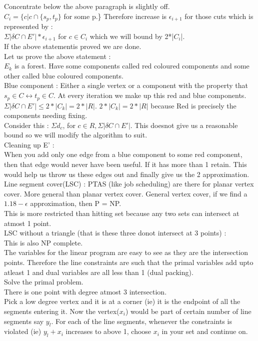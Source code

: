 \documentclass[solution,addpoints,12pt]{exam}
\begin{document}
Concentrate below the above paragraph is slightly off.\\

$C_i = \{c | c \cap \{s_p, t_p\}$ for  some p.\}
Therefore increase is $\epsilon_{i+1}$ for those cuts which is represented by :\\
$\Sigma |\delta C \cap E'|*\epsilon_{i+1}$ for $c \in C_i$ which we will bound
by 2*|$C_i$|.\\
If the above statementis proved we are done.\\

Let us prove the above statement :\\
$E_k$ is a forest. Have some components called red coloured
components and some other called blue coloured components.\\
Blue component : Either a single vertex or a component with the property that
$s_p \in C \leftrightarrow t_p \in C$. At every iteration
we make up this red and blue components.\\
$\Sigma |\delta C \cap E'| \le 2*|C_k| = 2*|R|$. $2*|C_k| = 2*|R|$
because Red is precisely the components needing fixing.\\

Consider this : $\Sigma d_c$, for $c \in R, \Sigma |\delta C \cap E'|$.
This doesnot give us a reasonable bound so we will modify the algorithm
to suit.\\
Cleaning up E' :\\
When you add only one edge from a blue component to some red
component, then that edge would never have been useful. If it
has more than 1 retain. This would help us throw us these edges out
and finally give us the 2 approximation.\\

Line segment cover(LSC) : PTAS (like job scheduling) are there for planar
vertex cover.
More general than planar vertex cover. General vertex cover,
if we find a $1.18 - \epsilon$ approximation, then P = NP.\\
This is more restricted than hitting set because any two
sets can intersect at atmost 1 point.\\

LSC without a triangle (that is these three donot intersect at 3 points) :\\
This is also NP complete.\\
The variables for the linear program are easy to see as they are the
intersection points. Therefore the line constraints are such that the
primal variables add upto atleast 1 and dual variables are all less than
1 (dual packing).\\
Solve the primal problem.\\
There is one point with degree atmost 3 intersection.\\
Pick a low degree vertex and it is at a corner (ie) it is the
endpoint of all the segments entering it. Now the vertex($x_i$) would
be part of certain number of line segments say $y_l$. For each of the line segments,
whenever the constraints is violated (ie) $y_l + x_i$ increases to above 1, choose
$x_i$ in your set and continue on.
\end{document}
